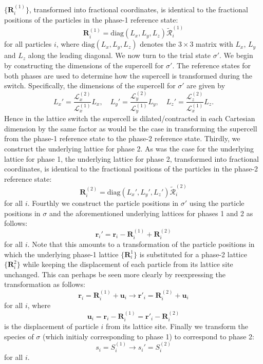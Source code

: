 \documentclass{report}
\begin{document}
$\lbrace\mathbf{R}^{(1)}_i\rbrace$, transformed into fractional coordinates, is identical to the fractional positions of the particles in the phase-1 
reference state:
\begin{equation}
\mathbf{R}^{(1)}_i = \text{diag}(L_x,L_y,L_z)\tilde{\mathcal{R}}^{(1)}_i
\end{equation}
for all particles $i$, where $\text{diag}(L_x,L_y,L_z)$ denotes the $3\times 3$ matrix with $L_x$, $L_y$ and $L_z$ along the leading diagonal. We now turn
to the trial state $\sigma'$. We begin by constructing the dimensions of the supercell for $\sigma'$. The reference states for both phases are 
used to determine how the supercell is transformed during the switch. Specifically, the dimensions of the supercell for $\sigma'$ are given by
\begin{equation}
L_x'=\frac{\mathcal{L}_x^{(2)}}{\mathcal{L}_x^{(1)}}L_x, \quad 
L_y'=\frac{\mathcal{L}_y^{(2)}}{\mathcal{L}_y^{(1)}}L_y, \quad 
L_z'=\frac{\mathcal{L}_z^{(2)}}{\mathcal{L}_x^{(1)}}L_z.
\end{equation}
Hence in the lattice switch the supercell is dilated/contracted in each Cartesian dimension by the same factor as would be the case in transforming the
supercell from the phase-1 reference state to the phase-2 reference state.
Thirdly, we construct the underlying lattice for phase 2. As was the case for the underlying lattice for phase 1, the underlying lattice for phase
2, transformed into fractional coordinates, is identical to the fractional positions of the particles in the phase-2 reference state:
\begin{equation}
\mathbf{R}^{(2)}_i = \text{diag}(L_x',L_y',L_z')\tilde{\mathcal{R}}^{(2)}_i
\end{equation}
for all $i$.
Fourthly we construct the particle positions in $\sigma'$ using the particle positions in $\sigma$ and the aforementioned underlying lattices for
phases 1 and 2 as follows:
\begin{equation}
\mathbf{r}_i'=\mathbf{r}_i-\mathbf{R}^{(1)}_i+\mathbf{R}^{(2)}_i
\end{equation}
for all $i$. Note that this amounts to a transformation of the particle positions in which the underlying phase-1 lattice $\lbrace\mathbf{R}^{1}_i\rbrace$ 
is substituted for a phase-2 lattice $\lbrace\mathbf{R}^{2}_i\rbrace$ while keeping the displacement of each particle from its lattice site unchanged. 
This can perhaps be seen more clearly by reexpressing the transformation as follows:
\begin{equation}
\mathbf{r}_i=\mathbf{R}^{(1)}_i+\mathbf{u}_i \to \mathbf{r}'_i=\mathbf{R}^{(2)}_i+\mathbf{u}_i
\end{equation}
for all $i$, where
\begin{equation}
\mathbf{u}_i=\mathbf{r}_i-\mathbf{R}^{(1)}_i=\mathbf{r}'_i-\mathbf{R}^{(2)}_i
\end{equation}
is the displacement of particle $i$ from its lattice site.
Finally we transform the species of $\sigma$ (which initialy corresponding to phase 1) to correspond to phase 2:
\begin{equation}
s_i= S^{(1)}_i\to s_i'= S^{(2)}_i
\end{equation}
for all $i$.
\end{document}
